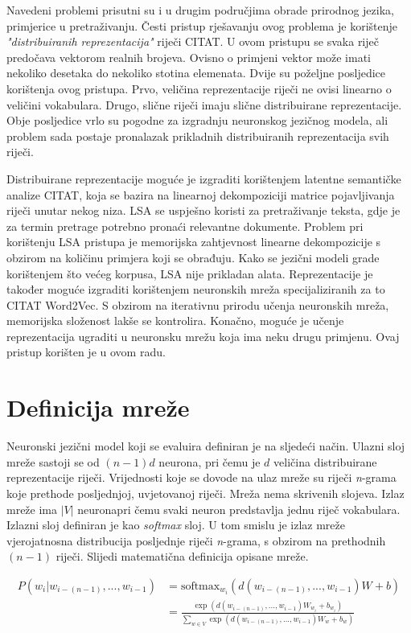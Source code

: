 \documentclass[times, utf8, diplomski, numeric]{fer}
\begin{document}
Navedeni problemi prisutni su i u drugim područjima obrade prirodnog jezika, primjerice u pretraživanju. Česti pristup rješavanju ovog problema je korištenje \textit{"distribuiranih reprezentacija"} riječi CITAT. U ovom pristupu se svaka riječ predočava vektorom realnih brojeva. Ovisno o primjeni vektor može imati nekoliko desetaka do nekoliko stotina elemenata. Dvije su poželjne posljedice korištenja ovog pristupa. Prvo, veličina reprezentacije riječi ne ovisi linearno o veličini vokabulara. Drugo, slične riječi imaju slične distribuirane reprezentacije. Obje posljedice vrlo su pogodne za izgradnju neuronskog jezičnog modela, ali problem sada postaje pronalazak prikladnih distribuiranih reprezentacija svih riječi.

Distribuirane reprezentacije moguće je izgraditi korištenjem latentne semantičke analize CITAT, koja se bazira na linearnoj dekompoziciji matrice pojavljivanja riječi unutar nekog niza. LSA se uspješno koristi za pretraživanje teksta, gdje je za termin pretrage potrebno pronaći relevantne dokumente. Problem pri korištenju LSA pristupa je memorijska zahtjevnost linearne dekompozicije s obzirom na količinu primjera koji se obrađuju. Kako se jezični modeli grade korištenjem što većeg korpusa, LSA nije prikladan alata. Reprezentacije je također moguće izgraditi korištenjem neuronskih mreža specijaliziranih za to CITAT Word2Vec. S obzirom na iterativnu prirodu učenja neuronskih mreža, memorijska složenost lakše se kontrolira. Konačno, moguće je učenje reprezentacija ugraditi u neuronsku mrežu koja ima neku drugu primjenu. Ovaj pristup korišten je u ovom radu.

\section{Definicija mreže}

Neuronski jezični model koji se evaluira definiran je na sljedeći način. Ulazni sloj mreže sastoji se od $(n - 1) d$ neurona, pri čemu je $d$ veličina distribuirane reprezentacije riječi. Vrijednosti koje se dovode na ulaz mreže su riječi \textit{n}-grama koje prethode posljednjoj, uvjetovanoj riječi. Mreža nema skrivenih slojeva. Izlaz mreže ima $|V|$ neuronapri čemu svaki neuron predstavlja jednu riječ vokabulara. Izlazni sloj definiran je kao \textit{softmax} sloj. U tom smislu je izlaz mreže vjerojatnosna distribucija posljednje riječi \textit{n}-grama, s obzirom na prethodnih $(n - 1)$ riječi. Slijedi matematična definicija opisane mreže.

\begin{equation}
\label{eq:lnnet}
\begin{split}
P(w_i | w_{i - (n - 1)}, ... , w_{i - 1}) 
  & = \text{softmax}_{w_i}(d(w_{i - (n - 1)}, ... , w_{i - 1}) W + b) \\
  & = \frac{\exp(d(w_{i - (n - 1)}, ... , w_{i - 1}) W_{w_i} + b_{w_i})}
           {\sum_{w \in V} \exp(d(w_{i - (n - 1)}, ... , w_{i - 1}) W_{w} + b_{w})}
\end{split}
\end{equation}
\end{document}
